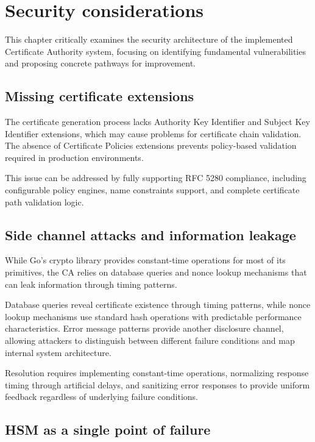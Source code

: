\chapter{Security considerations}

This chapter critically examines the security architecture of the implemented Certificate 
Authority system, focusing on identifying fundamental vulnerabilities and proposing 
concrete pathways for improvement.


\section{Missing certificate extensions}

The certificate generation process lacks Authority Key Identifier and Subject Key Identifier extensions,
which may cause problems for certificate chain validation. The absence of Certificate Policies extensions 
prevents policy-based validation required in production environments.

This issue can be addressed by fully supporting RFC 5280 \cite{rfc5280} compliance, 
including configurable policy engines, name constraints support, and complete certificate path 
validation logic.


\section{Side channel attacks and information leakage}

While Go's crypto library provides constant-time operations for most of its primitives, the CA
relies on database queries and nonce lookup mechanisms that can leak information through timing
patterns. 

Database queries reveal certificate existence through timing patterns, while nonce lookup mechanisms 
use standard hash operations with predictable performance characteristics. Error message patterns
provide another disclosure channel, allowing attackers to distinguish between different failure 
conditions and map internal system architecture.

Resolution requires implementing constant-time operations, normalizing response timing through 
artificial delays, and sanitizing error responses to provide uniform feedback regardless of underlying 
failure conditions.


\section{HSM as a single point of failure}

